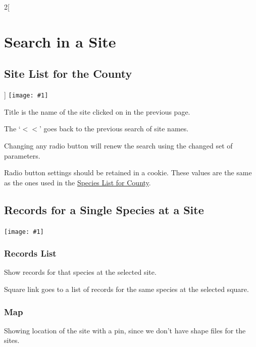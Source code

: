 \documentclass[a4paper,12pt,landscape]{article}
\newcommand{\wireframe}[1]{\texttt{[image: \#1]}\clearpage}
\begin{document}
\begin{multicols*}{2}[%
  \section{Search in a Site}%
  \subsection{Site List for the County}%
]
\wireframe{./wireframes/Species__ListForSite.png}%

\begin{todolist}
  \item Title is the name of the site clicked on in the previous page.
  \item The `$<<$' goes back to the previous search of site names.
  \item Changing any radio button will renew the search using the changed set of parameters.
  \item Radio button settings should be retained in a cookie.
    These values are the same as the ones used in the \hyperref[sec:species-list-for-county]{Species List for County}.

\end{todolist}
\clearpage

\subsection{Records for a Single Species at a Site}

\wireframe{./wireframes/Records__SingleSpeciesForSite.png}%

\subsubsection*{Records List} 

\begin{todolist}
  \item Show records for that species at the selected site.
  \item Square link goes to a list of records for the same species at the selected square.
\end{todolist}

\subsubsection*{Map}

\begin{todolist}
  \item Showing location of the site with a pin, since we don't have shape files for the sites.
\end{todolist}

\clearpage
\end{multicols*}
\end{document}
